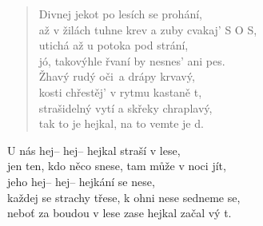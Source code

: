 \begin{song}{}
\begin{verse}
   Divnej jekot po lesích se prohání, \\
   až v žilách tuhne krev a zuby cvakaj' S O S, \\
   utichá až u potoka pod strání, \\
   jó, takovýhle řvaní by nesnes' ani pes. \\
   Žhavý rudý oči~a drápy krvavý,  \\
   kosti chřestěj' v rytmu kastaně t, \\
   strašidelný vytí a skřeky chraplavý,  \\
   tak to je hejkal, na to vemte je d. 
\end{verse}
\begin{refren}
   U nás hej-- hej-- hejkal straší v lese, \\
   jen ten, kdo něco snese, tam může v noci jít, \\
   jeho hej-- hej-- hejkání se nese, \\
   každej se strachy třese, k ohni nese sedneme se, \\
   neboť za boudou v lese zase hejkal začal vý t.
\end{refren}

\chordbreak
\compactbreak 


\end{song}
